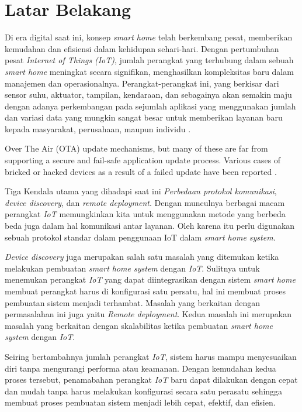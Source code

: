 \section{Latar Belakang}

Di era digital saat ini, konsep \textit{smart home} telah berkembang pesat, memberikan kemudahan dan efisiensi dalam kehidupan sehari-hari. Dengan pertumbuhan pesat \textit{Internet of Things} \textit{(IoT)}, jumlah perangkat yang terhubung dalam sebuah \textit{smart home} meningkat secara signifikan, menghasilkan kompleksitas baru dalam manajemen dan operasionalnya. Perangkat-perangkat ini, yang berkisar dari sensor suhu, aktuator, tampilan, kendaraan, dan sebagainya akan semakin maju dengan adanya perkembangan pada sejumlah aplikasi yang menggunakan jumlah dan variasi data yang mungkin sangat besar untuk memberikan layanan baru kepada masyarakat, perusahaan, maupun individu \parencite{IOTSmartCity}.

Over The Air (OTA) update mechanisms, but many of these are far from supporting a secure and fail-safe application update process. Various cases of bricked or hacked devices as a result of a failed update have been reported \parencite{RemoteDeployment}.

Tiga Kendala utama yang dihadapi saat ini \textit{Perbedaan protokol komunikasi}, \textit{device discovery}, dan \textit{remote deployment}. Dengan munculnya berbagai macam perangkat \textit{IoT} memungkinkan kita untuk menggunakan metode yang berbeda beda juga dalam hal komunikasi antar layanan. Oleh karena itu perlu digunakan sebuah protokol standar dalam penggunaan IoT dalam \textit{smart home system}.

\textit{Device discovery} juga merupakan salah satu masalah yang ditemukan ketika melakukan pembuatan \textit{smart home system} dengan \textit{IoT}. Sulitnya untuk menemukan perangkat \textit{IoT} yang dapat diintegrasikan dengan sistem \textit{smart home} membuat perangkat harus di konfigurasi satu persatu, hal ini membuat proses pembuatan sistem menjadi terhambat. Masalah yang berkaitan dengan permasalahan ini juga yaitu \textit{Remote deployment}. Kedua masalah ini merupakan masalah yang berkaitan dengan skalabilitas ketika pembuatan \textit{smart home system} dengan \textit{IoT}.

Seiring bertambahnya jumlah perangkat \textit{IoT}, sistem harus mampu menyesuaikan diri tanpa mengurangi performa atau keamanan. Dengan kemudahan kedua proses tersebut, penamabahan perangkat \textit{IoT} baru dapat dilakukan dengan cepat dan mudah tanpa harus melakukan konfigurasi secara satu perasatu sehingga membuat proses pembuatan sistem menjadi lebih cepat, efektif, dan efisien.

